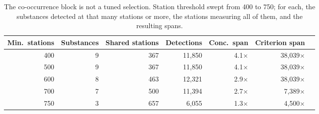 \begin{table}[htbp]\centering\scriptsize\setlength{\tabcolsep}{2.4pt}
\caption{The co-occurrence block is not a tuned selection. Station threshold swept from 400 to 750; for each, the substances detected at that many stations or more, the stations measuring all of them, and the resulting spans.}
\label{tab:s4}
\begin{tabular}{rrrrrrr}\toprule
Min.\ stations & Substances & Shared stations & Detections & Conc.\ span & Criterion span\\\midrule
400 & 9 & 367 & 11,850 & 4.1$\times$ & 38,039$\times$\\
500 & 9 & 367 & 11,850 & 4.1$\times$ & 38,039$\times$\\
600 & 8 & 463 & 12,321 & 2.9$\times$ & 38,039$\times$\\
700 & 7 & 500 & 11,394 & 2.7$\times$ & 7,389$\times$\\
750 & 3 & 657 & 6,055 & 1.3$\times$ & 4,500$\times$\\
\bottomrule\end{tabular}\end{table}
